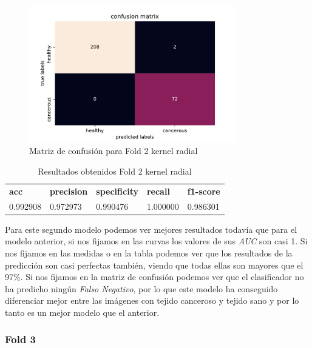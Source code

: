 \begin{figure}[H]
	\centering
	\includegraphics[width=90mm]{imagenes/confusion_mat2_gpflow}
	\caption{Matriz de confusión para Fold 2 kernel radial}
	\label{fig:conf2}
\end{figure}

\begin{table}[H]
	\centering
	\begin{tabular}{lllll}
		\textbf{acc} & \textbf{precision} & \textbf{specificity} & \textbf{recall} & \textbf{f1-score} \\
		0.992908     & 0.972973           & 0.990476             & 1.000000        & 0.986301         \\      
	\end{tabular}
	\caption{Resultados obtenidos Fold 2 kernel radial}
	\label{table:2}
\end{table}

Para este segundo modelo podemos ver mejores resultados todavía que para el modelo anterior, si nos fijamos en las curvas los valores de sus \textit{AUC} son casi 1. Si nos fijamos en las medidas o en la tabla podemos ver que los resultados de la predicción son casi perfectas también, viendo que todas ellas son mayores que el 97\%. Si nos fijamos en la matriz de confusión podemos ver que el clasificador no ha predicho ningún \textit{Falso Negativo}, por lo que este modelo ha conseguido diferenciar mejor entre las imágenes con tejido canceroso y tejido sano y por lo tanto es un mejor modelo que el anterior.

\subsubsection{Fold 3}

